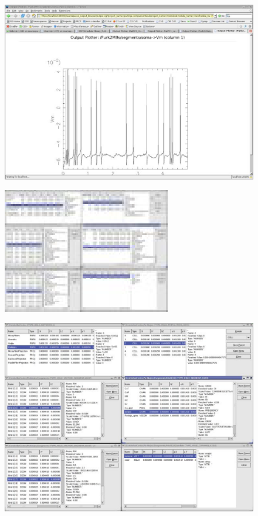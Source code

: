 \documentclass[12pt]{article}
\begin{document}
\begin{figure}[h]
  \centering
 \includegraphics[scale=0.6]{figs/screenshot-4.eps}
  \label{fig:pb-1}
\end{figure}

\begin{figure}[h]
  \centering
 \includegraphics[scale=0.6]{figs/screenshot-5.eps}
  \label{fig:pb-1}
\end{figure}

\begin{figure}[h]
  \centering
 \includegraphics[scale=0.6]{figs/screenshot-6.eps}
  \label{fig:pb-1}
\end{figure}
\end{document}
